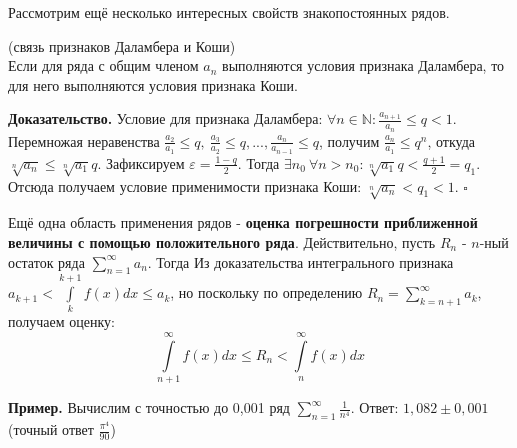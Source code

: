 Рассмотрим ещё несколько интересных свойств знакопостоянных рядов. 
\begin{theor}
    (связь признаков Даламбера и Коши)\\
    Если для ряда с общим членом $a_n$ выполняются условия признака Даламбера,
    то для него выполняются условия признака Коши. 
\end{theor}
\textbf{Доказательство.} Условие для признака Даламбера: 
$\forall n\in\mathbb{N}:\frac{a_{n+1}}{a_n}\leqslant q<1$. Перемножая 
неравенства $\frac{a_2}{a_1}\leqslant q,~\frac{a_3}{a_2}\leqslant q,...
,\frac{a_n}{a_{n-1}}\leqslant q$, получим $\frac{a_n}{a_1}\leqslant q^n$, 
откуда $\sqrt[n]{a_n}\leqslant\sqrt[n]{a_1}q$. Зафиксируем 
$\varepsilon=\frac{1-q}{2}$. Тогда $\exists n_0~\forall n>n_0:\sqrt[n]{a_1}q<
\frac{q+1}{2}=q_1$. Отсюда получаем условие применимости признака Коши:
$\sqrt[n]{a_n}<q_1<1$. $\square$ 

Ещё одна область применения рядов - \textbf{оценка погрешности приближенной 
величины с помощью положительного ряда}. Действительно, пусть 
$R_n$ -  $n$-ный остаток ряда  $\sum\limits_{n=1}^{\infty} a_n$. Тогда
Из доказательства интегрального признака $a_{k+1}<\int\limits_{k}^{k+1}f(x)dx
\leqslant a_k$, но поскольку по определению $R_n=\sum\limits_{k=n+1}^{\infty}
a_k$, получаем оценку:
$$\int\limits_{n+1}^{\infty}f(x)dx\leqslant R_n<
\int\limits_{n}^{\infty}f(x)dx$$ 

\textbf{Пример.} Вычислим с точностью до 0,001 ряд 
$\sum\limits_{n=1}^{\infty} \frac{1}{n^4}$. Ответ: $1,082\pm0,001$
(точный ответ $\frac{\pi^4}{90}$)











